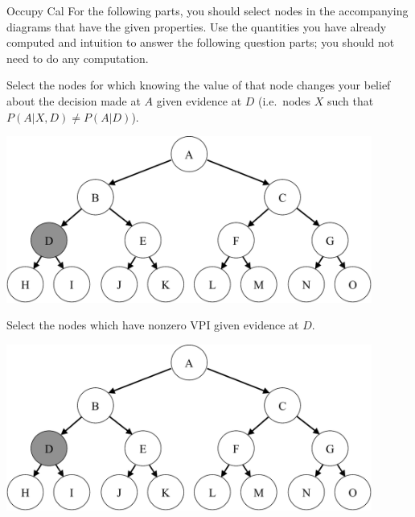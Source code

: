 \begin{problem}[14]{Occupy Cal}
For the following parts, you should select nodes in the accompanying diagrams that have the given properties. Use the quantities you have already computed and intuition to answer the following question parts; you should not need to do any computation.


\begin{question}[5] Select the nodes for which knowing the value of that node changes your belief about the decision made at $A$ given evidence at $D$ (i.e.~nodes $X$ such that $P(A|X,D) \neq P(A|D)$).

\vspace{-0.3cm}
\begin{center}
\includegraphics[width=120mm]{figures/tree-labeled-d-crop.pdf}
\end{center}
\TwoF
{}
\end{question}
\newpage
\begin{question}[5] Select the nodes which have nonzero VPI given evidence at $D$.

\vspace{5mm}
\begin{center}
\includegraphics[width=120mm]{figures/tree-labeled-d-crop.pdf}
\end{center}
\TwoG
\vspace{5mm}
\end{question}
\end{problem}